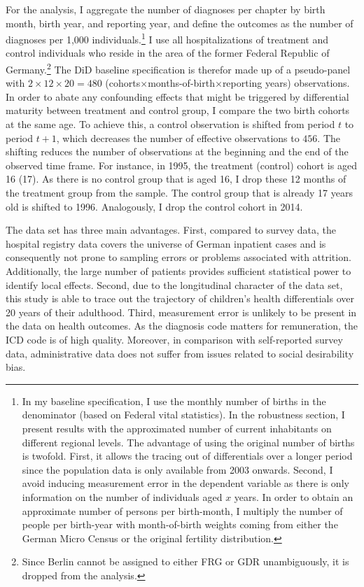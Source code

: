 For the analysis, I aggregate the number of diagnoses per chapter by birth month, birth year, and reporting year, and define the outcomes as the number of diagnoses per 1,000 individuals.\footnote{In my baseline specification, I use the monthly number of births in the denominator (based on Federal vital statistics). In the robustness section, I present results with the approximated number of current inhabitants on different regional levels. The advantage of using the original number of births is twofold. First, it allows the tracing out of differentials over a longer period since the population data is only available from 2003 onwards. Second, I avoid inducing measurement error in the dependent variable as there is only information on the number of individuals aged $x$ years. In order to obtain an approximate number of persons per birth-month, I multiply the number of people per birth-year with month-of-birth weights coming from either the German Micro Census or the original fertility distribution.} I use all hospitalizations of treatment and control individuals who reside in the area of the former Federal Republic of Germany.\footnote{Since Berlin cannot be assigned to either FRG or GDR unambiguously, it is dropped from the analysis.} The DiD baseline specification is therefor made up of a pseudo-panel with $2\times12\times20=480$ (cohorts$\times$months-of-birth$\times$reporting years) observations. In order to abate any confounding effects that might be triggered by differential maturity between treatment and control group, I compare the two birth cohorts at the same age. To achieve this, a control observation is shifted from period $t$ to period $t+1$, which decreases the number of effective observations to $456$. The shifting reduces the number of observations at the beginning and the end of the observed time frame. For instance, in 1995, the treatment (control) cohort is aged 16 (17). As there is no control group that is aged 16, I drop these 12 months of the treatment group from the sample. The control group that is already 17 years old is shifted to 1996. Analogously, I drop the control cohort in 2014. %



The data set has three main advantages. First, compared to survey data, the hospital registry data covers the universe of German inpatient cases and is consequently not prone to sampling errors or problems associated with attrition. Additionally, the large number of patients provides sufficient statistical power to identify local effects. Second, due to the longitudinal character of the data set, this study is able to trace out the trajectory of children's health differentials over 20 years of their adulthood. Third, measurement error is unlikely to be present in the data on health outcomes. As the diagnosis code matters for remuneration, the ICD code is of high quality. Moreover, in comparison with self-reported survey data, administrative data does not suffer from issues related to social desirability bias.

